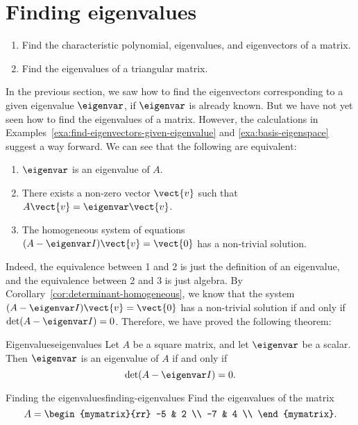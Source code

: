 \section{Finding eigenvalues}

\begin{outcome}
  \begin{enumerate}
  \item Find the characteristic polynomial, eigenvalues, and
    eigenvectors of a matrix.
  \item Find the eigenvalues of a triangular matrix.
  \end{enumerate}
\end{outcome}

In the previous section, we saw how to find the eigenvectors
corresponding to a given eigenvalue $\eigenvar$, if $\eigenvar$ is already
known. But we have not yet seen how to find the eigenvalues of a
matrix. However, the calculations in
Examples~\ref{exa:find-eigenvectors-given-eigenvalue} and
{\ref{exa:basis-eigenspace}} suggest a way forward. We can see that
the following are equivalent:
\begin{enumerate}
\item $\eigenvar$ is an eigenvalue of $A$.
\item There exists a non-zero vector $\vect{v}$ such that
  $A\vect{v}=\eigenvar\vect{v}$.
\item The homogeneous system of equations
  $(A-\eigenvar I)\vect{v}=\vect{0}$ has a non-trivial solution.
\end{enumerate}
Indeed, the equivalence between 1 and 2 is just the definition of an
eigenvalue, and the equivalence between 2 and 3 is just algebra.
By Corollary~\ref{cor:determinant-homogeneous}, we know that the
system $(A-\eigenvar I)\vect{v}=\vect{0}$ has a non-trivial solution if
and only if $\det(A-\eigenvar I)=0$. Therefore, we have proved the
following theorem:

\begin{theorem}{Eigenvalues}{eigenvalues}
  Let $A$ be a square matrix, and let $\eigenvar$ be a scalar. Then
  $\eigenvar$ is an eigenvalue of $A$ if and only if
  \begin{equation*}
    \det(A-\eigenvar I)=0.
  \end{equation*}
\end{theorem}

\begin{example}{Finding the eigenvalues}{finding-eigenvalues}
  Find the eigenvalues of the matrix
  \begin{equation*}
    A = \begin{mymatrix}{rr}
      -5 & 2 \\
      -7 & 4 \\
    \end{mymatrix}.
  \end{equation*}
\end{example}

